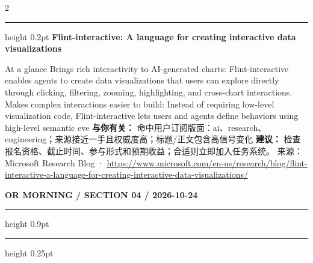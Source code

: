 \documentclass[10.5pt]{ctexart}
\begin{document}
\begin{multicols}{2}
\vspace{2mm}
\hrule height 0.2pt
\vspace{2mm}
{\large\bfseries Flint-interactive: A language for creating interactive data visualizations}\par
At a glance Brings rich interactivity to AI-generated charts: Flint-interactive enables agents to create data visualizations that users can explore directly through clicking, filtering, zooming, highlighting, and cross-chart interactions. Makes complex interactions easier to build: Instead of requiring low-level visualization code, Flint-interactive lets users and agents define behaviors using high-level semantic eve
\textbf{与你有关：} 命中用户订阅版面：ai、research、engineering；来源接近一手且权威度高；标题/正文包含高信号变化
\textbf{建议：} 检查报名资格、截止时间、参与形式和预期收益；合适则立即加入任务系统。
{\footnotesize\color{ormuted} 来源：Microsoft Research Blog · \url{https://www.microsoft.com/en-us/research/blog/flint-interactive-a-language-for-creating-interactive-data-visualizations/}}
\end{multicols}
\newpage
{\small\bfseries OR MORNING / SECTION 04 / 2026-10-24}
\vspace{2mm}
\hrule height 0.9pt
\vspace{1.5mm}
\hrule height 0.25pt
\vspace{4mm}
\end{document}
